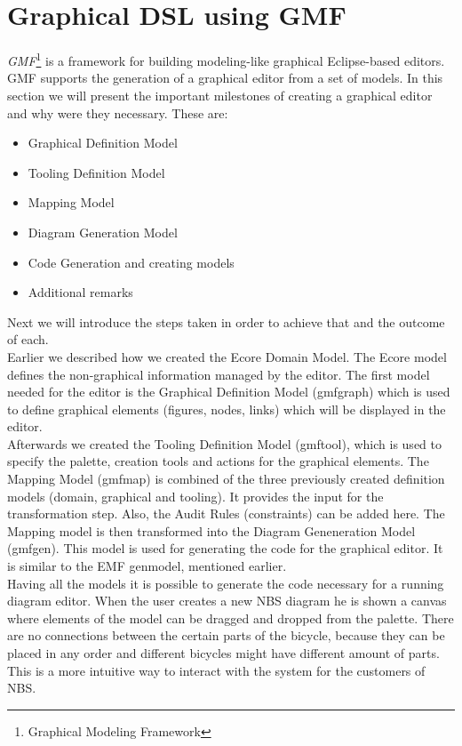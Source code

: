 \section{Graphical DSL using GMF}
\label{sec.gmf}

\noindent \emph{GMF}\footnote{Graphical Modeling Framework} is a framework for
building modeling-like graphical Eclipse-based editors.
\cite{Article_Introducing_GMF} GMF supports the generation of a graphical editor
from a set of models. In this section we will present the important
milestones of creating a graphical editor and why were they necessary. These
are:

\begin{itemize}
  \item Graphical Definition Model
  \item Tooling Definition Model
  \item Mapping Model
  \item Diagram Generation Model
  \item Code Generation and creating models
  \item Additional remarks
\end{itemize}
Next we will introduce the steps taken in order to achieve
that and the outcome of each.\\

\noindent Earlier we described how we created the Ecore Domain Model. The Ecore
model defines the non-graphical information managed by the editor. The first
model needed for the editor is the Graphical Definition Model (gmfgraph) which
is used to define graphical elements (figures, nodes, links)
which will be displayed in the editor. \\

\noindent Afterwards we created the Tooling Definition Model (gmftool),
which is used to specify the palette, creation tools and actions for the
graphical elements. The Mapping Model (gmfmap) is combined of the three
previously created definition models (domain, graphical and tooling).
It provides the input for the transformation step. Also, the Audit Rules
(constraints) can be added here. The Mapping model is then transformed into the Diagram
Geneneration Model (gmfgen). This model is used for generating the code for the graphical
editor. It is similar to the EMF genmodel, mentioned earlier.
\cite{GMF_Tutorial}\\

\noindent Having all the models it is possible to generate the code necessary
for a running diagram editor. When the user creates a new NBS diagram he is
shown a canvas where elements of the model can be dragged and dropped from the
palette. There are no connections between the certain parts
of the bicycle, because they can be placed in any order and different bicycles
might have different amount of parts. This is a more intuitive way to interact
with the system for the customers of NBS.\\

